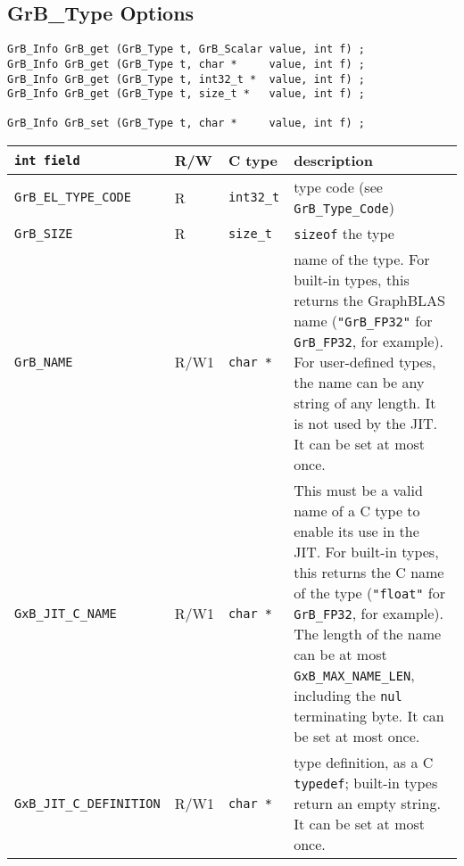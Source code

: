 
\newpage
\subsection{{\sf GrB\_Type} Options}
\label{get_set_type}

\begin{mdframed}[userdefinedwidth=6in]
{\footnotesize
\begin{verbatim}
GrB_Info GrB_get (GrB_Type t, GrB_Scalar value, int f) ;
GrB_Info GrB_get (GrB_Type t, char *     value, int f) ;
GrB_Info GrB_get (GrB_Type t, int32_t *  value, int f) ;
GrB_Info GrB_get (GrB_Type t, size_t *   value, int f) ;

GrB_Info GrB_set (GrB_Type t, char *     value, int f) ;
\end{verbatim}
}\end{mdframed}

\noindent
{\small
\begin{tabular}{|l|l|l|p{2.85in}|}
\hline
\verb'int field'                    & R/W  & C type        & description \\
\hline
\verb'GrB_EL_TYPE_CODE'             & R    & \verb'int32_t'& type code (see \verb'GrB_Type_Code') \\
\verb'GrB_SIZE'                     & R    & \verb'size_t' & \verb'sizeof' the type \\
\hline
\verb'GrB_NAME'                     & R/W1 & \verb'char *' &    %
    name of the type.  For built-in types, this returns the GraphBLAS
    name (\verb'"GrB_FP32"' for \verb'GrB_FP32', for example).
    For user-defined types, the name can be any string of any length.  It is
    not used by the JIT.  It can be set at most once. \\
\verb'GxB_JIT_C_NAME'               & R/W1 & \verb'char *' & 
    This must be a valid name of a C type to enable its use in the JIT.  For
    built-in types, this returns the C name of the type (\verb'"float"' for
    \verb'GrB_FP32', for example). The length of the name can be at most
    \verb'GxB_MAX_NAME_LEN', including the \verb'nul' terminating byte.  It can
    be set at most once. \\
\verb'GxB_JIT_C_DEFINITION'               & R/W1 & \verb'char *' &
    type definition, as a C \verb'typedef';
    built-in types return an empty string. 
    It can be set at most once. \\
\hline
\end{tabular}
}

